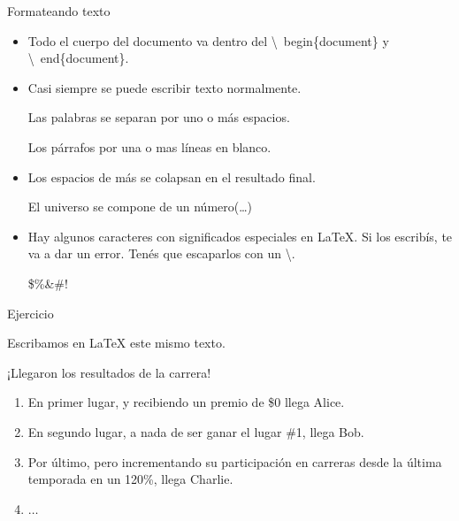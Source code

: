\begin{frame}[fragile]{Formateando texto}
    \small
    \begin{itemize}
    \item Todo el cuerpo del documento va dentro del \textbackslash\ begin\{document\} y \textbackslash\ end\{document\}.
    \item Casi siempre se puede escribir texto normalmente.
    \begin{exampletwouptiny}
    Las palabras se separan 
    por uno o más espacios.

    Los párrafos por una o 
    mas líneas en blanco.
    \end{exampletwouptiny}
    \item Los espacios de más se colapsan en el resultado final.
    \begin{exampletwouptiny}

    El     universo    se compone 
    de un           número(\dots)
        
    \end{exampletwouptiny}
    \item Hay algunos caracteres con significados especiales en \LaTeX{}. Si los escribís, te va a dar un error. Tenés que escaparlos con un \textbackslash.
    \begin{exampletwoup}
        \$\%\&\#!
        \end{exampletwoup}
    \end{itemize}
\end{frame}


\begin{frame}[fragile]{Ejercicio}

    Escribamos en \LaTeX{}  este mismo texto.

    \begin{tcolorbox}[colframe=color1]
        \begin{center}
            ¡Llegaron los resultados de la carrera!
            \begin{enumerate}
            \item En primer lugar, y recibiendo un premio de \$0 llega Alice.
            \item En segundo lugar, a nada de ser ganar el lugar \#1, llega Bob.
            \item Por último, pero incrementando su participación en carreras desde la última temporada en un 120\%, llega Charlie.
            \item $\ldots$
            \end{enumerate}
        \end{center}
    \end{tcolorbox}
    
\end{frame}

